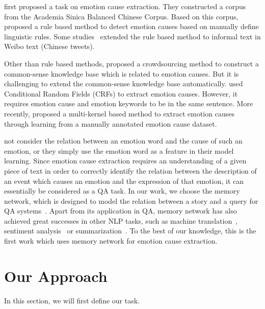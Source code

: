 \documentclass[11pt,letterpaper]{article}
\begin{document}
\begin{CJK*}{UTF8}{gbsn}
 first proposed a task on emotion cause extraction. They  constructed a corpus from the Academia Sinica Balanced Chinese Corpus. Based on this corpus,  proposed a rule based method to detect emotion causes based on manually define linguistic rules. Some studies~\cite{gui2014emotion,li2014text,gao2015rule} extended the rule based method to informal text in Weibo text (Chinese tweets).

Other than rule based methods,  proposed a crowdsourcing method to construct a common-sense knowledge base which is related to emotion causes. But it is challenging to extend the common-sense knowledge base automatically.  used Conditional Random Fields (CRFs) to extract emotion causes. However, it requires emotion cause and emotion keywords to be in the same sentence. More recently,  proposed a multi-kernel based method to extract emotion causes through learning from a manually annotated emotion cause dataset. 



 not consider the relation between an emotion word and the cause of such an emotion, or they simply use the emotion word as a feature in their model learning. Since emotion cause extraction requires an understanding of a given piece of text in order to correctly identify the relation between the description of an event which causes an emotion and the expression of that emotion, it can essentially be considered as a QA task. In our work, we choose the memory network, which is designed to model the relation between a story and a query for QA systems~\cite{weston2014memory, Sukhbaatar2015end}. Apart from its application in QA, memory network has also achieved great successes in other NLP tasks, such as machine translation~\cite{Luong2015MT}, sentiment analysis~\cite{tang2016memory} or summarization~\cite{rush2015summarization}. To the best of our knowledge, this is the first work which uses memory network for emotion cause extraction. 

\section{Our Approach}
\label{sec:section3}

In this section, we will first define our task.  


\end{CJK*}
\end{document}
